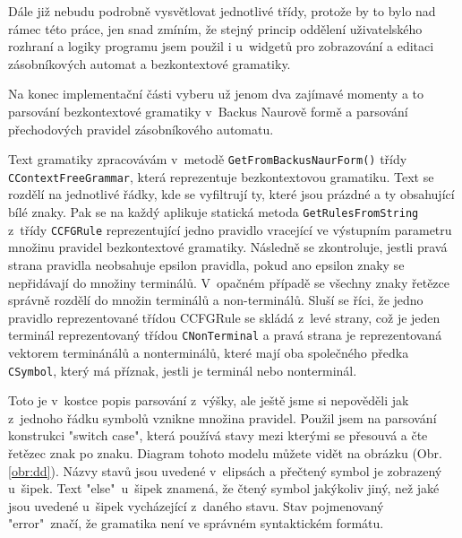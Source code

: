 Dále již nebudu podrobně vysvětlovat jednotlivé třídy, protože by to bylo nad rámec této práce, jen snad zmíním, že stejný princip oddělení uživatelského rozhraní a logiky programu jsem použil i u~widgetů pro zobrazování a editaci zásobníkových automat a bezkontextové gramatiky.

Na konec implementační části vyberu už jenom dva zajímavé momenty a to parsování bezkontextové gramatiky v~Backus Naurově formě a parsování přechodových pravidel zásobníkového automatu.



Text gramatiky zpracovávám v~metodě \texttt{GetFromBackusNaurForm()} třídy \texttt{CContextFreeGrammar}, která reprezentuje bezkontextovou gramatiku. Text se rozdělí na jednotlivé řádky, kde se vyfiltrují ty, které jsou prázdné a ty obsahující bílé znaky. Pak se na každý aplikuje statická metoda \texttt{GetRulesFromString} z~třídy \texttt{CCFGRule} reprezentující jedno pravidlo vracející ve výstupním parametru množinu pravidel bezkontextové gramatiky. Následně se zkontroluje, jestli pravá strana pravidla neobsahuje epsilon pravidla, pokud ano epsilon znaky se nepřidávají do množiny terminálů. V~opačném případě se všechny znaky řetězce správně rozdělí do množin terminálů a non-terminálů. Sluší se říci, že jedno pravidlo reprezentované třídou CCFGRule se skládá z~levé strany, což je jeden terminál reprezentovaný třídou \texttt{CNonTerminal} a pravá strana je reprezentovaná vektorem terminánálů a nonterminálů, které mají oba společného předka \texttt{CSymbol}, který má příznak, jestli je terminál nebo nonterminál. 

Toto je v~kostce popis parsování z~výšky, ale ještě jsme si nepověděli jak z~jednoho řádku symbolů vznikne množina pravidel. Použil jsem na parsování konstrukci "switch case", která používá stavy mezi kterými se přesouvá a čte řetězec znak po znaku. Diagram tohoto modelu můžete vidět na obrázku (Obr. \ref{obr:dd}). Názvy stavů jsou uvedené v~elipsách a přečtený symbol je zobrazený u~šipek. Text "else"\ u~šipek znamená, že čtený symbol jakýkoliv jiný, než jaké jsou uvedené u~šipek vycházející z~daného stavu. Stav pojmenovaný "error"\ značí, že gramatika není ve správném syntaktickém formátu. 


